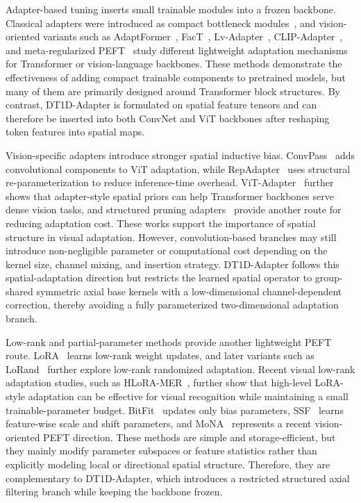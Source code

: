 \documentclass[pdflatex,sn-mathphys-num]{sn-jnl}
\theoremstyle{thmstyleone}
\theoremstyle{thmstyletwo}
\theoremstyle{thmstylethree}
\begin{document}
Adapter-based tuning inserts small trainable modules into a frozen backbone. 
Classical adapters were introduced as compact bottleneck modules~\cite{houlsby2019adapter}, and vision-oriented variants such as AdaptFormer~\cite{chen2022adaptformer}, FacT~\cite{jie2023fact}, Lv-Adapter~\cite{xu2024lvadapter}, CLIP-Adapter~\cite{gao2024clipadapter}, and meta-regularized PEFT~\cite{park2026peftmetar} study different lightweight adaptation mechanisms for Transformer or vision-language backbones. 
These methods demonstrate the effectiveness of adding compact trainable components to pretrained models, but many of them are primarily designed around Transformer block structures. 
By contrast, DT1D-Adapter is formulated on spatial feature tensors and can therefore be inserted into both ConvNet and ViT backbones after reshaping token features into spatial maps.

Vision-specific adapters introduce stronger spatial inductive bias. 
ConvPass~\cite{jie2024convpass} adds convolutional components to ViT adaptation, while RepAdapter~\cite{luo2023repadapter} uses structural re-parameterization to reduce inference-time overhead. 
ViT-Adapter~\cite{chen2023vitadapter} further shows that adapter-style spatial priors can help Transformer backbones serve dense vision tasks, and structured pruning adapters~\cite{hedegaard2024spa} provide another route for reducing adaptation cost. 
These works support the importance of spatial structure in visual adaptation. 
However, convolution-based branches may still introduce non-negligible parameter or computational cost depending on the kernel size, channel mixing, and insertion strategy. 
DT1D-Adapter follows this spatial-adaptation direction but restricts the learned spatial operator to group-shared symmetric axial base kernels with a low-dimensional channel-dependent correction, thereby avoiding a fully parameterized two-dimensional adaptation branch.

Low-rank and partial-parameter methods provide another lightweight PEFT route. 
LoRA~\cite{hu2022lora} learns low-rank weight updates, and later variants such as LoRand~\cite{yin2023lorand} further explore low-rank randomized adaptation. 
Recent visual low-rank adaptation studies, such as HLoRA-MER~\cite{shao2025hlora}, further show that high-level LoRA-style adaptation can be effective for visual recognition while maintaining a small trainable-parameter budget. 
BitFit~\cite{zaken2022bitfit} updates only bias parameters, SSF~\cite{lian2022ssf} learns feature-wise scale and shift parameters, and MoNA~\cite{yin2025mona} represents a recent vision-oriented PEFT direction. 
These methods are simple and storage-efficient, but they mainly modify parameter subspaces or feature statistics rather than explicitly modeling local or directional spatial structure. 
Therefore, they are complementary to DT1D-Adapter, which introduces a restricted structured axial filtering branch while keeping the backbone frozen.
\end{document}
